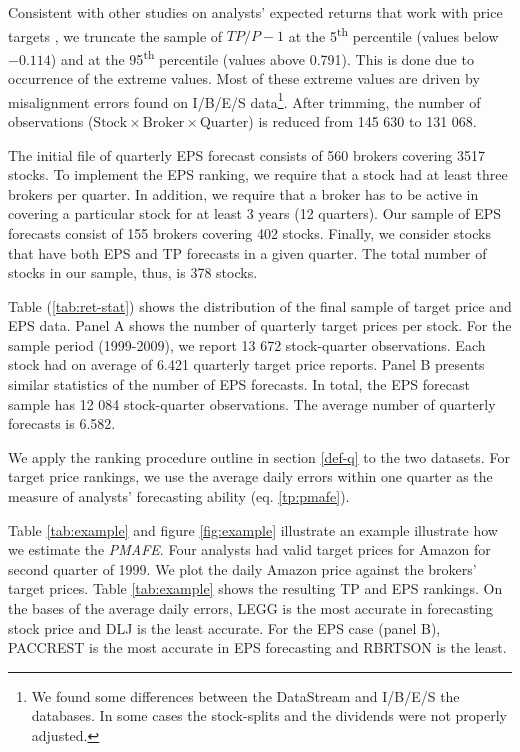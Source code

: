 \documentclass{article}\usepackage[]{graphicx}\usepackage[]{color}
\begin{document}
Consistent with other studies on analysts' expected returns that work with price targets  \citep{bradshaw2002,brav2003,da2011}, we truncate the sample of $TP/P-1$ at the 5\textsuperscript{th} percentile (values below \ensuremath{-0.114}) and at the 95\textsuperscript{th} percentile (values above 0.791). This is done due to occurrence of the extreme values. Most of these extreme values are driven by misalignment errors found on I/B/E/S data\footnote{We found some differences between the  DataStream and I/B/E/S the databases. In some cases the stock-splits and the dividends were not properly adjusted.}. After trimming, the number of observations ($\mathrm{Stock} \times \mathrm{Broker} \times  \mathrm{Quarter}$) is reduced  from 145 630 to 131 068.

The initial file of quarterly EPS forecast consists of  560 brokers covering 3517 stocks. To implement the EPS ranking, we require that a stock had at least three brokers per quarter. In addition, we require that a broker has to be active in covering a particular stock for at least 3 years (12 quarters). Our sample of EPS forecasts consist of  155 brokers covering 402 stocks. Finally, we consider stocks that have both EPS and TP forecasts in a given quarter. The total number of stocks in our sample, thus, is 378 stocks.

 

Table (\ref{tab:ret-stat}) shows the distribution of the final sample of target price and EPS data. Panel A shows the number of quarterly target prices per stock. For the sample period (1999-2009), we report 13 672 stock-quarter observations. Each stock had on average of 6.421 quarterly target price reports. Panel B  presents similar statistics of the number of EPS forecasts. In total, the EPS forecast sample has 12 084 stock-quarter observations. The average number of quarterly forecasts is 6.582.

We apply the ranking procedure outline in section \ref{def-q} to the two datasets. For target price rankings, we use the average daily errors within one quarter as the measure of analysts' forecasting ability (eq. \ref{tp:pmafe}). 

Table \ref{tab:example} and figure \ref{fig:example} illustrate an example illustrate how we estimate the \textit{PMAFE}. Four analysts had valid target prices for Amazon for second quarter of 1999. We plot the daily Amazon price against the brokers' target prices. Table \ref{tab:example} shows the resulting TP and EPS rankings. On the bases of the average daily errors, LEGG is the most accurate in forecasting stock price and  DLJ is the least accurate. For the EPS case (panel B), PACCREST is the most accurate in EPS forecasting and RBRTSON is the least. 
\end{document}
